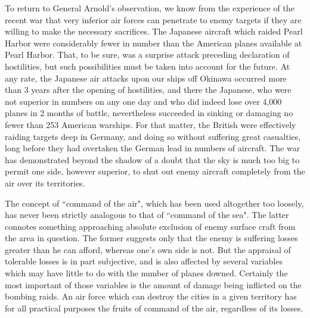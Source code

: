 To return to General Arnold's observation, we know from the experience of the recent war that very inferior air forces can penetrate to enemy targets if they are willing to make the necessary sacrifices. The Japanese aircraft which raided Pearl Harbor were considerably fewer in number than the American planes available at Pearl Harbor. That, to be sure, was a surprise attack preceding declaration of hostilities, but such possibilities must be taken into account for the future. At any rate, the Japanese air attacks upon our ships off Okinawa occurred more than 3 years after the opening of hostilities, and there the Japanese, who were not superior in numbers on any one day and who did indeed lose over 4,000 planes in 2 months of battle, nevertheless succeeded in sinking or damaging no fewer than 253 American warships. For that matter, the British were effectively raiding targets deep in Germany, and doing so without suffering great casualties, long before they had overtaken the German lead in numbers of aircraft. The war has demonstrated beyond the shadow of a doubt that the sky is much too big to permit one side, however superior, to shut out enemy aircraft completely from the air over its territories.

The concept of ``command of the air", which has been used altogether too loosely, has never been strictly analogous to that of ``command of the sea". The latter connotes something approaching absolute exclusion of enemy surface craft from the area in question. The former suggests only that the enemy is suffering losses greater than he can afford, whereas one's own side is not. But the appraisal of tolerable losses is in part subjective, and is also affected by several variables which may have little to do with the number of planes downed. Certainly the most important of those variables is the amount of damage being inflicted on the bombing raids. An air force which can destroy the cities in a given territory has for all practical purposes the fruits of command of the air, regardless of its losses.

